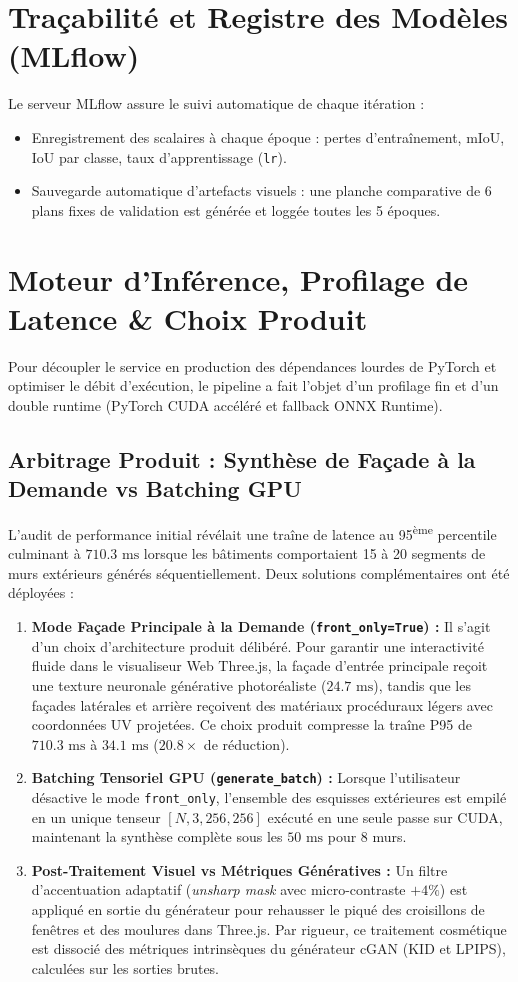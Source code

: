 \documentclass[11pt,a4paper]{report}
\begin{document}
\section{Traçabilité et Registre des Modèles (MLflow)}
Le serveur MLflow assure le suivi automatique de chaque itération :
\begin{itemize}
    \item Enregistrement des scalaires à chaque époque : pertes d'entraînement, mIoU, IoU par classe, taux d'apprentissage (\texttt{lr}).
    \item Sauvegarde automatique d'artefacts visuels : une planche comparative de 6 plans fixes de validation est générée et loggée toutes les 5 époques.
\end{itemize}

\section{Moteur d'Inférence, Profilage de Latence \& Choix Produit}
Pour découpler le service en production des dépendances lourdes de PyTorch et optimiser le débit d'exécution, le pipeline a fait l'objet d'un profilage fin et d'un double runtime (PyTorch CUDA accéléré et fallback ONNX Runtime). 

\subsection{Arbitrage Produit : Synthèse de Façade à la Demande vs Batching GPU}
L'audit de performance initial révélait une traîne de latence au 95\textsuperscript{ème} percentile culminant à $710.3\text{ ms}$ lorsque les bâtiments comportaient 15 à 20 segments de murs extérieurs générés séquentiellement. Deux solutions complémentaires ont été déployées :
\begin{enumerate}
    \item \textbf{Mode Façade Principale à la Demande (\texttt{front\_only=True}) :} Il s'agit d'un choix d'architecture produit délibéré. Pour garantir une interactivité fluide dans le visualiseur Web Three.js, la façade d'entrée principale reçoit une texture neuronale générative photoréaliste ($24.7\text{ ms}$), tandis que les façades latérales et arrière reçoivent des matériaux procéduraux légers avec coordonnées UV projetées. Ce choix produit compresse la traîne P95 de $710.3\text{ ms}$ à \textbf{$34.1\text{ ms}$} ($20.8\times$ de réduction).
    \item \textbf{Batching Tensoriel GPU (\texttt{generate\_batch}) :} Lorsque l'utilisateur désactive le mode \texttt{front\_only}, l'ensemble des esquisses extérieures est empilé en un unique tenseur $[N, 3, 256, 256]$ exécuté en une seule passe sur CUDA, maintenant la synthèse complète sous les $50\text{ ms}$ pour 8 murs.
    \item \textbf{Post-Traitement Visuel vs Métriques Génératives :} Un filtre d'accentuation adaptatif (\emph{unsharp mask} avec micro-contraste $+4\%$) est appliqué en sortie du générateur pour rehausser le piqué des croisillons de fenêtres et des moulures dans Three.js. Par rigueur, ce traitement cosmétique est dissocié des métriques intrinsèques du générateur cGAN (KID et LPIPS), calculées sur les sorties brutes.
\end{enumerate}
\end{document}

